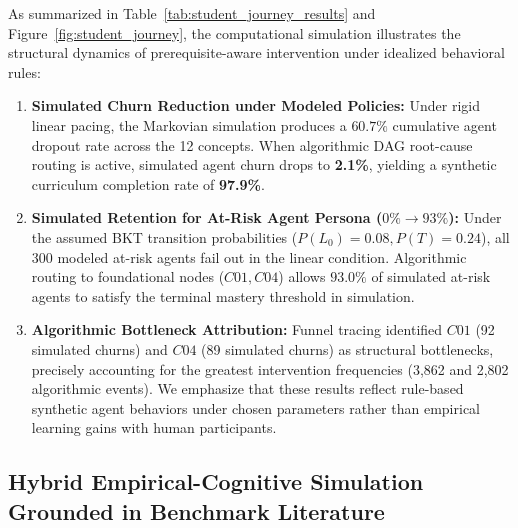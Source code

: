 \documentclass[a4paper,12pt]{report}
\begin{document}
As summarized in Table~\ref{tab:student_journey_results} and Figure~\ref{fig:student_journey}, the computational simulation illustrates the structural dynamics of prerequisite-aware intervention under idealized behavioral rules:
\begin{enumerate}
    \item \textbf{Simulated Churn Reduction under Modeled Policies:} Under rigid linear pacing, the Markovian simulation produces a $60.7\%$ cumulative agent dropout rate across the 12 concepts. When algorithmic DAG root-cause routing is active, simulated agent churn drops to \textbf{2.1\%}, yielding a synthetic curriculum completion rate of \textbf{97.9\%}.
    \item \textbf{Simulated Retention for At-Risk Agent Persona ($0\% \to 93\%$):} Under the assumed BKT transition probabilities ($P(L_0)=0.08, P(T)=0.24$), all 300 modeled at-risk agents fail out in the linear condition. Algorithmic routing to foundational nodes ($C01, C04$) allows $93.0\%$ of simulated at-risk agents to satisfy the terminal mastery threshold in simulation.
    \item \textbf{Algorithmic Bottleneck Attribution:} Funnel tracing identified $C01$ (92 simulated churns) and $C04$ (89 simulated churns) as structural bottlenecks, precisely accounting for the greatest intervention frequencies (3,862 and 2,802 algorithmic events). We emphasize that these results reflect rule-based synthetic agent behaviors under chosen parameters rather than empirical learning gains with human participants.
\end{enumerate}

\subsection{Hybrid Empirical-Cognitive Simulation Grounded in Benchmark Literature}
\label{sec:hybrid_student_simulation}
\end{document}
